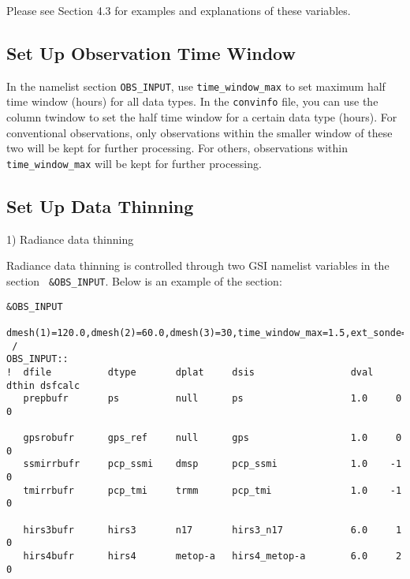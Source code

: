 Please see Section 4.3 for examples and explanations of these variables.

\subsection{Set Up Observation Time Window}

In the namelist section \verb|OBS_INPUT|, use \verb|time_window_max| to set maximum half time window (hours) for all data types. In the \verb|convinfo| file, you can use the column twindow to set the half time window for a certain data type (hours). For conventional observations, only observations within the smaller window of these two will be kept for further processing. For others, observations within \verb|time_window_max| will be kept for further processing.

\subsection{Set Up Data Thinning}

1) Radiance data thinning 

Radiance data thinning is controlled through two GSI namelist variables in the section \verb| &OBS_INPUT|. Below is an example of the section: 

\begin{scriptsize}
\begin{verbatim}
&OBS_INPUT
   dmesh(1)=120.0,dmesh(2)=60.0,dmesh(3)=30,time_window_max=1.5,ext_sonde=.true.,
 /
OBS_INPUT::
!  dfile          dtype       dplat     dsis                 dval    dthin dsfcalc
   prepbufr       ps          null      ps                   1.0     0     0
 
   gpsrobufr      gps_ref     null      gps                  1.0     0     0
   ssmirrbufr     pcp_ssmi    dmsp      pcp_ssmi             1.0    -1     0
   tmirrbufr      pcp_tmi     trmm      pcp_tmi              1.0    -1     0
 
   hirs3bufr      hirs3       n17       hirs3_n17            6.0     1     0
   hirs4bufr      hirs4       metop-a   hirs4_metop-a        6.0     2     0
\end{verbatim}
\end{scriptsize}

